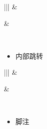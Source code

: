 \documentclass[a4paper,10pt,english]{sphinxmanual}
\begin{document}
\begin{savenotes}\sphinxattablestart
\centering
\begin{tabular}[t]{|||}
\hline
{}\relax &\relax \\
\hline\begin{sphinxfigure-in-table}
\centering

\noindent{}
\end{sphinxfigure-in-table}\relax
&\begin{sphinxfigure-in-table}
\centering

\noindent{}
\end{sphinxfigure-in-table}\relax
\\
\hline
\end{tabular}
\par
\sphinxattableend\end{savenotes}
\begin{itemize}
\item {} 
内部跳转

\end{itemize}


\begin{savenotes}\sphinxattablestart
\centering
\begin{tabular}[t]{|||}
\hline
{}\relax &\relax \\
\hline\begin{sphinxfigure-in-table}
\centering

\noindent{}
\end{sphinxfigure-in-table}\relax
&\begin{sphinxfigure-in-table}
\centering

\noindent{}
\end{sphinxfigure-in-table}\relax
\\
\hline
\end{tabular}
\par
\sphinxattableend\end{savenotes}
\begin{itemize}
\item {} 
脚注

\end{itemize}
\end{document}
